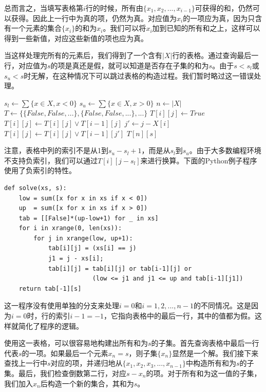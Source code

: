 \documentclass[b5paper]{ctexart}
\begin{document}
总而言之，当填写表格第$i$行的时候，所有由$\{x_1, x_2, ..., x_{i-1}\}$可获得的和，仍然可以获得。因此上一行中为真的项，仍然为真。对应值为$x_i$的一项应为真，因为只含有一个元素的集合$\{x_i\}$的和为$x_i$。我们可以将$x_i$加到已知的所有和之上，这样可以得到一些新值，对应这些新值的项也应为真。

当这样处理完所有的元素后，我们得到了一个含有$|X|$行的表格。通过查询最后一行，对应值为$s$的项是真还是假，就可以知道是否存在子集的和为$s$。由于$s < s_l$或$s_u < s$时无解，在这种情况下可以跳过表格的构造过程。我们暂时略过这一错误处理。

\begin{algorithmic}[1]
  \State $s_l \gets \sum \{x \in X, x < 0\}$
  \State $s_u \gets \sum \{x \in X, x > 0\}$
  \State $n \gets |X|$
  \State $T \gets \{\{False, False, ...\}, \{False, False, ...\}, ...\}$ 
        \State $T[i][j] \gets True$
      \EndIf
        \State $T[i][j] \gets T[i][j] \lor T[i-1][j]$
        \State $j' \gets j - X[i]$
          \State $T[i][j] \gets T[i][j] \lor T[i-1][j']$
        \EndIf
      \EndIf
    \EndFor
  \EndFor
  \State \Return $T[n][s]$
\EndFunction
\end{algorithmic}

注意，表格中列的索引不是从1到$s_u-s_l + 1$，而是从$s_l$到$s_u$。由于大多数编程环境不支持负索引，我们可以通过$T[i][j-s_l]$来进行换算。下面的Python例子程序使用了负索引的特性。

\lstset{language=Python}
\begin{lstlisting}
def solve(xs, s):
    low = sum([x for x in xs if x < 0])
    up  = sum([x for x in xs if x > 0])
    tab = [[False]*(up-low+1) for _ in xs]
    for i in xrange(0, len(xs)):
        for j in xrange(low, up+1):
            tab[i][j] = (xs[i] == j)
            j1 = j - xs[i];
            tab[i][j] = tab[i][j] or tab[i-1][j] or
                        (low <= j1 and j1 <= up and tab[i-1][j1])
    return tab[-1][s]
\end{lstlisting}

这一程序没有使用单独的分支来处理$i = 0$和$i = 1, 2, ..., n-1$的不同情况。这是因为$i = 0$时，行的索引$i - 1 = -1$，它指向表格中的最后一行，其中的值都为假。这样就简化了程序的逻辑。

使用这一表格，可以很容易地构建出所有和为$s$的子集。首先查询表格中最后一行代表$s$的一项。如果最后一个元素$x_n = s$，则子集$\{x_n\}$显然是一个解。我们接下来查找上一行中$s$对应的项，并递归地从$\{x_1, x_2, x_3, ..., x_{n-1}\}$中构造所有和为$s$的子集。最后，我们检查倒数第二行，对应$s - x_n$的项。对于所有和为这一值的子集，我们加入$x_n$后构造一个新的集合，其和为$s$。
\end{document}
